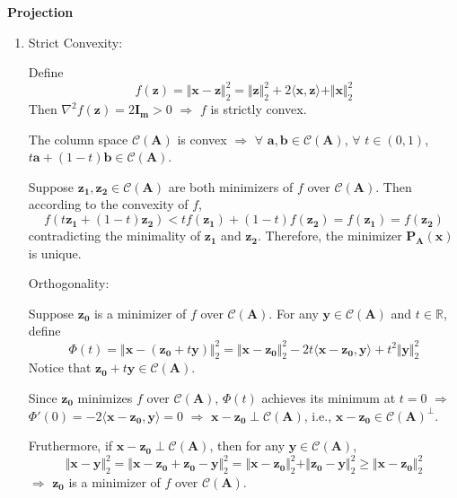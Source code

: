 \documentclass[11pt,letter,notitlepage]{article}
\newcommand{\proj}[2]{\textbf{P}_{#2} (#1)}
\begin{document}
\newpage

\begin{solution}\textbf{Projection}
\begin{enumerate}
	\item
	 Strict Convexity:

	Define
	$$f(\mathbf{z}) = \Vert \mathbf{x} - \mathbf{z} \Vert_2^2 = \Vert \mathbf{z} \Vert_2^2 + 2\langle \mathbf{x}, \mathbf{z} \rangle + \Vert \mathbf{x} \Vert_2^2$$
	Then $\nabla^2 f(\mathbf{z}) = 2 \mathbf{I_m} > 0$ $\Longrightarrow$ $f$ is strictly convex. 
	
	The column space $\mathcal{C}(\mathbf{A})$ is convex $\Longrightarrow$ $\forall$ $\mathbf{a}, \mathbf{b} \in \mathcal{C}(\mathbf{A})$, $\forall$ $t \in (0,1)$, $t\mathbf{a} + (1-t)\mathbf{b} \in \mathcal{C}(\mathbf{A})$. 
	
	Suppose $\mathbf{z_1}, \mathbf{z_2} \in \mathcal{C}(\mathbf{A})$ are both minimizers of $f$ over $\mathcal{C}(\mathbf{A})$. Then according to the convexity of $f$,
	\[
	f(t\mathbf{z_1} + (1-t)\mathbf{z_2}) < tf(\mathbf{z_1}) + (1-t)f(\mathbf{z_2}) = f(\mathbf{z_1}) = f(\mathbf{z_2})
	\]
	contradicting the minimality of $\mathbf{z_1}$ and $\mathbf{z_2}$. Therefore, the minimizer $\proj{\mathbf{x}}{\mathbf{A}}$ is unique.

	 Orthogonality:
	
	Suppose $\mathbf{z_0}$ is a minimizer of $f$ over $\mathcal{C}(\mathbf{A})$. For any $\mathbf{y} \in \mathcal{C}(\mathbf{A})$ and $t \in \mathbb{R}$, define
	$$\Phi(t) = \Vert \mathbf{x}-(\mathbf{z_0} + t\mathbf{y}) \Vert_2^2 = \Vert \mathbf{x} - \mathbf{z_0} \Vert_2^2 - 2t\langle\mathbf{x}-\mathbf{z_0}, \mathbf{y}\rangle + t^2 \Vert \mathbf{y} \Vert_2^2$$
	Notice that $\mathbf{z_0} + t\mathbf{y} \in \mathcal{C}(\mathbf{A})$.

	Since $\mathbf{z_0}$ minimizes $f$ over $\mathcal{C}(\mathbf{A})$, $\Phi(t)$ achieves its minimum at $t = 0$ $\Longrightarrow$ $\Phi'(0) = -2 \langle \mathbf{x} - \mathbf{z_0}, \mathbf{y} \rangle = 0$ $\Longrightarrow$ $\mathbf{x} - \mathbf{z_0} \perp \mathcal{C}(\mathbf{A})$, i.e., $\mathbf{x} - \mathbf{z_0} \in \mathcal{C}(\mathbf{A})^{\perp}$.

	Fruthermore, if $\mathbf{x} - \mathbf{z_0} \perp \mathcal{C}(\mathbf{A})$, then for any $\mathbf{y} \in \mathcal{C}(\mathbf{A})$,
	\[
	\Vert \mathbf{x} - \mathbf{y} \Vert_2^2 = \Vert \mathbf{x} - \mathbf{z_0} + \mathbf{z_0} - \mathbf{y} \Vert_2^2 = \Vert \mathbf{x} - \mathbf{z_0} \Vert_2^2 + \Vert \mathbf{z_0} - \mathbf{y} \Vert_2^2 \geq \Vert \mathbf{x} - \mathbf{z_0} \Vert_2^2
	\]
	$\Longrightarrow$ $\mathbf{z_0}$ is a minimizer of $f$ over $\mathcal{C}(\mathbf{A})$.


\end{enumerate}
\end{solution}
\end{document}
